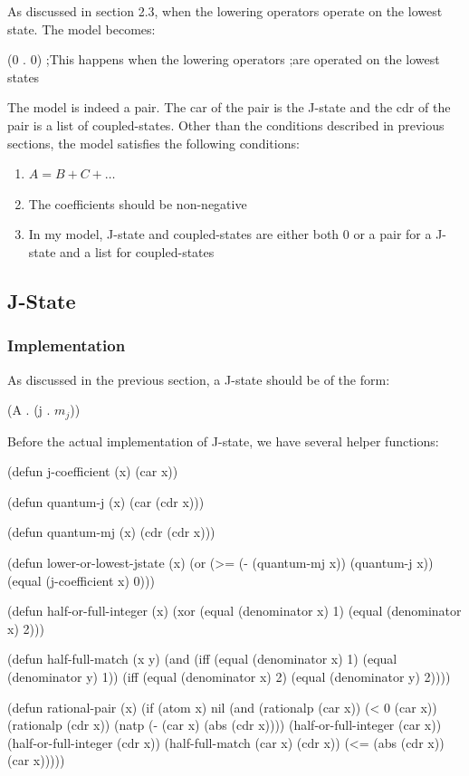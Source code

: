 \documentclass[12pt,journal,compsoc]{IEEEtran}
\begin{document}
As discussed in section 2.3, when the lowering operators operate on the lowest state. The model becomes:

\begin{acl2-lst}[breaklines=true,mathescape]
(0 . 0) 
;This happens when the lowering operators 
;are operated on the lowest states
\end{acl2-lst}

The model is indeed a pair. The car of the pair is the J-state and the cdr of the pair is a list of coupled-states. Other than the conditions described in previous sections, the model satisfies the following conditions:

\begin{enumerate}

\item $A=B+C+ \ldots$

\item The coefficients should be non-negative

\item In my model, J-state and coupled-states are either both 0 or a pair for a J-state and a list for coupled-states

\end{enumerate}

\subsection{J-State}

\subsubsection{Implementation}

As discussed in the previous section, a J-state should be of the form:

\begin{acl2-lst}
(A . (j . $m_j$))
\end{acl2-lst}

Before the actual implementation of J-state, we have several helper functions:

\begin{acl2-lst}
(defun j-coefficient (x) 
 (car x))

(defun quantum-j (x)
 (car (cdr x)))

(defun quantum-mj (x)
 (cdr (cdr x)))

(defun lower-or-lowest-jstate (x)
  (or (>= (- (quantum-mj x)) (quantum-j x))
     (equal (j-coefficient x) 0)))

(defun half-or-full-integer (x)
  (xor (equal (denominator x) 1)
       (equal (denominator x) 2)))

(defun half-full-match (x y)
  (and (iff (equal (denominator x) 1)
	    (equal (denominator y) 1))
       (iff (equal (denominator x) 2)
	    (equal (denominator y) 2))))

(defun rational-pair (x)
  (if (atom x) 
      nil
      (and (rationalp (car x))
	   (< 0 (car x))
	   (rationalp (cdr x))
	   (natp (- (car x) (abs (cdr x))))
	   (half-or-full-integer (car x))
	   (half-or-full-integer (cdr x))
	   (half-full-match (car x) (cdr x))
	   (<= (abs (cdr x)) (car x)))))
\end{acl2-lst}
\end{document}
